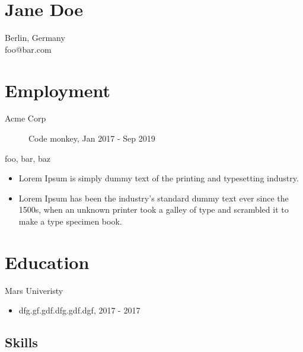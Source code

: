 \documentclass[10pt]{article}
\begin{document}
\section{Jane Doe}
Berlin, Germany\\
foo@bar.com


\begin{paracol}{2}
\begin{leftcolumn}
\section{Employment}

\begin{description}
    \item [Acme Corp] Code monkey, Jan 2017 - Sep 2019
    \item [\footnotesize{
     foo,  bar,  baz 
    }]
\end{description}
\begin{itemize}
    
    \item Lorem Ipsum is simply dummy text of the printing and typesetting industry.
    
    \item Lorem Ipsum has been the industry's standard dummy text ever since the 1500s, when an unknown printer took a galley of type and scrambled it to make a type specimen book.
    
\end{itemize}

\section{Education}

\begin{description}
    \item [Mars Univeristy]
\end{description}
\begin{itemize}
    \item dfg.gf.gdf.dfg.gdf.dgf, 2017 - 2017
\end{itemize}

\end{leftcolumn}

\begin{rightcolumn}
\section{Skills}


\end{rightcolumn}
\end{paracol}
\end{document}
